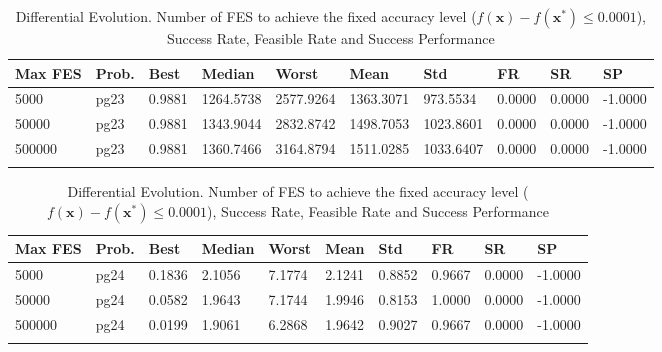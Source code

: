 \documentclass[10pt, a4paper]{book}
\begin{document}
\begin{center}
\begin{longtable}{l l l l l l l l l l}
\textbf{Max FES} & \textbf{Prob.} & \textbf{Best} & \textbf{Median} & \textbf{Worst} & \textbf{Mean} & \textbf{Std} & \textbf{FR} & \textbf{SR} & \textbf{SP} \\
\hline
5000 & pg23 & 0.9881 & 1264.5738 & 2577.9264 & 1363.3071 & 973.5534 & 0.0000 & 0.0000 & -1.0000 \\
50000 & pg23 & 0.9881 & 1343.9044 & 2832.8742 & 1498.7053 & 1023.8601 & 0.0000 & 0.0000 & -1.0000 \\
500000 & pg23 & 0.9881 & 1360.7466 & 3164.8794 & 1511.0285 & 1033.6407 & 0.0000 & 0.0000 & -1.0000 \\

\caption{ Differential Evolution. Number of FES to achieve the fixed accuracy level ($f(\mathbf{x}) - f(\mathbf{x}^{*}) \leq 0.0001$), Success Rate, Feasible Rate and Success Performance }
\end{longtable}
\end{center}

\begin{center}
\begin{longtable}{l l l l l l l l l l}
\textbf{Max FES} & \textbf{Prob.} & \textbf{Best} & \textbf{Median} & \textbf{Worst} & \textbf{Mean} & \textbf{Std} & \textbf{FR} & \textbf{SR} & \textbf{SP} \\
\hline
5000 & pg24 & 0.1836 & 2.1056 & 7.1774 & 2.1241 & 0.8852 & 0.9667 & 0.0000 & -1.0000 \\
50000 & pg24 & 0.0582 & 1.9643 & 7.1744 & 1.9946 & 0.8153 & 1.0000 & 0.0000 & -1.0000 \\
500000 & pg24 & 0.0199 & 1.9061 & 6.2868 & 1.9642 & 0.9027 & 0.9667 & 0.0000 & -1.0000 \\

\caption{ Differential Evolution. Number of FES to achieve the fixed accuracy level ($f(\mathbf{x}) - f(\mathbf{x}^{*}) \leq 0.0001$), Success Rate, Feasible Rate and Success Performance }
\end{longtable}
\end{center}
\end{document}
